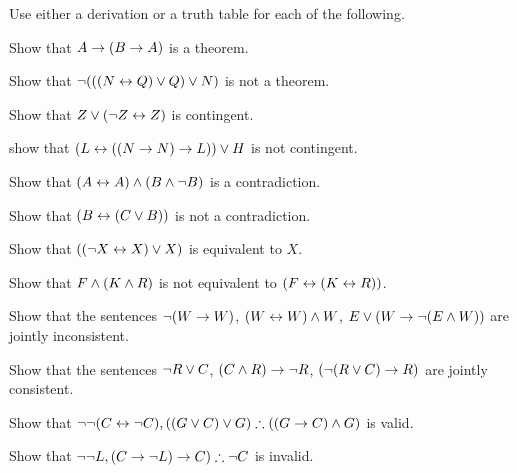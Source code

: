\noindent\problempart Use either a derivation or a truth table for each of the following.
\begin{compactlist}%
\item Show that $A \rightarrow (B \rightarrow A)$ is a theorem.
\item Show that $\neg (((N \leftrightarrow Q) \vee Q) \vee N)$ is not a theorem.
\item Show that $ Z \vee (\neg Z \leftrightarrow Z) $ is contingent.
\item show that $ (L \leftrightarrow ((N \rightarrow N) \rightarrow L)) \vee H $ is not contingent.
\item Show that $ (A \leftrightarrow A) \wedge (B \wedge \neg B)$ is a contradiction.
\item Show that $ (B \leftrightarrow (C \vee B)) $ is not a contradiction.
\item Show that $ ((\neg X \leftrightarrow X) \vee X) $ is equivalent to $X$.
\item Show that $F \wedge (K \wedge R) $ is not equivalent to $ (F \leftrightarrow (K \leftrightarrow R))$.
\item Show that the sentences $ \neg (W \rightarrow W)$, $(W \leftrightarrow W) \wedge W$, $E \vee (W \rightarrow \neg (E \wedge W))$ are jointly inconsistent.
\item Show that the sentences  $\neg R \vee C $, $(C \wedge R) \rightarrow \neg R$, $(\neg (R \vee C) \rightarrow R) $ are jointly consistent.
\item Show that $\neg \neg (C \leftrightarrow \neg C), ((G \vee C) \vee G) \therefore ((G \rightarrow C) \wedge G) $ is valid.
\item Show that $ \neg \neg L,  (C \rightarrow \neg L) \rightarrow C) \therefore \neg C$ is invalid.
\end{compactlist}

